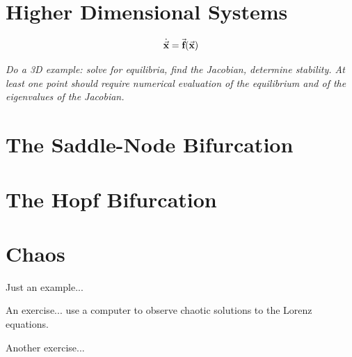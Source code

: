 \section{Higher Dimensional Systems}
\[
  \dot{\vec{\textbf{x}}} = \vec{\textbf{f}}(\vec{\textbf{x}})
\]
\begin{xexample}
\emph{Do a 3D example: solve for equilibria, find the
Jacobian, determine stability.  At least one point
should require numerical evaluation of the equilibrium
and of the eigenvalues of the Jacobian.}
\end{xexample}
%

\section{The Saddle-Node Bifurcation}

\section{The Hopf Bifurcation}

\section{Chaos}
Just an example...

\begin{exercises}
\begin{exercise}
An exercise... use a computer to observe chaotic solutions
to the Lorenz equations.
\end{exercise}
\begin{exercise}
Another exercise...
\end{exercise}
\end{exercises}
%
%
